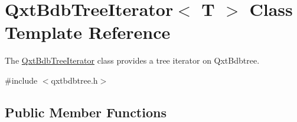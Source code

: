 \hypertarget{class_qxt_bdb_tree_iterator}{\section{Qxt\-Bdb\-Tree\-Iterator$<$ T $>$ Class Template Reference}
\label{class_qxt_bdb_tree_iterator}
}


The \hyperlink{class_qxt_bdb_tree_iterator}{Qxt\-Bdb\-Tree\-Iterator} class provides a tree iterator on Qxt\-Bdbtree.  




{\ttfamily \#include $<$qxtbdbtree.\-h$>$}

\subsection*{Public Member Functions}
